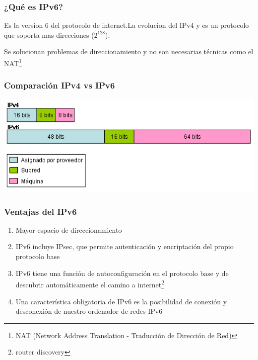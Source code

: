 \documentclass{beamer}
\begin{document}
\begin{frame}
\frametitle{¿Qué es IPv6?}

Es la version 6 del protocolo de internet.La evolucion del IPv4 y es un protocolo que soporta mas direcciones ($2^{128}$).\vspace{0.3cm}
\par Se solucionan problemas de direccionamiento y no son necesarias técnicas como el NAT\footnote{NAT (Network Address Translation - Traducción de Dirección de Red)}
\end{frame}

\begin{frame}
\frametitle{Comparación IPv4 vs IPv6}

\includegraphics[scale=0.87]{estructura_direccion.png}

\end{frame}

\begin{frame}
\frametitle{Ventajas del IPv6}

\begin{enumerate}[$*$]

	\item Mayor espacio de direccionamiento
	\item IPv6  incluye IPsec, que permite autenticación y encriptación del propio protocolo base
	\item IPv6 tiene una función de autoconfiguración en el protocolo base y de descubrir automáticamente el camino a internet\footnote{router discovery}
	\item Una característica obligatoria de IPv6 es la posibilidad de conexión y desconexión de nuestro ordenador de redes IPv6
\end{enumerate}
\end{frame}
\end{document}
